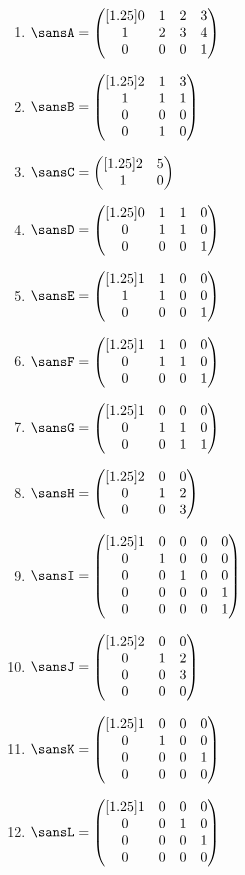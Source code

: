 \documentclass[12 pt]{article}
\newcommand{\pmat}[1]{\begin{pmatrix}[1.25]#1\end{pmatrix}}
\begin{document}
\setlength{\columnsep}{1.875in}
\begin{multicols}{3}
\begin{enumerate}[itemsep=1in,label=,leftmargin=-0.125in, rightmargin=-0.125in]
	\item $\sansA=\pmat{0 & 1 & 2 & 3 \\ 1 & 2 & 3 & 4 \\ 0 & 0 & 0 & 1}$
	\item $\sansB=\pmat{2 & 1 & 3 \\ 1 & 1 & 1  \\ 0 & 0 & 0 \\ 0 & 1 & 0 }$
	\item $\sansC=\pmat{2 & 5 \\ 1 & 0}$
	\item $\sansD=\pmat{0 & 1 & 1 & 0 \\ 0 & 1 & 1 & 0 \\ 0 & 0 & 0 & 1}$
	\item $\sansE=\pmat{1 & 1 & 0 & 0 \\ 1 & 1 & 0 & 0 \\ 0 & 0 & 0 & 1}$
	\item $\sansF=\pmat{1 & 1 & 0 & 0 \\ 0 & 1 & 1 & 0 \\ 0 & 0 & 0 & 1}$
	\item $\sansG=\pmat{1 & 0 & 0 & 0 \\ 0 & 1 & 1 & 0 \\ 0 & 0 & 1 & 1}$
	\item $\sansH=\pmat{2 & 0 & 0 \\ 0 & 1 & 2 \\ 0 & 0 & 3}$
	\item $\sansI=\pmat{1 & 0 & 0 & 0 & 0\\ 0 & 1 & 0 & 0 & 0 \\ 0 & 0 & 1 & 0 & 0 \\ 0 & 0 & 0 & 0 & 1 \\ 0 & 0 & 0 & 0 & 1}$
	\item $\sansJ=\pmat{2 & 0 & 0 \\ 0 & 1 & 2 \\ 0 & 0 & 3 \\ 0 & 0 & 0 }$
	\item $\sansK=\pmat{1 & 0 & 0 & 0 \\ 0 & 1 & 0 & 0 \\ 0 & 0 & 0 & 1 \\ 0 & 0 & 0 & 0}$
	\item $\sansL=\pmat{1 & 0 & 0 & 0 \\ 0 & 0 & 1 & 0 \\ 0 & 0 & 0 & 1 \\ 0 & 0 & 0 & 0}$
\end{enumerate}
\end{multicols}
\end{document}

